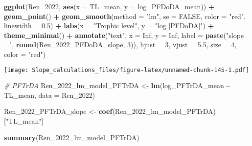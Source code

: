 \documentclass[
]{article}
\newenvironment{Shaded}{\begin{snugshade}}{\end{snugshade}}
\newcommand{\AttributeTok}[1]{\textcolor[rgb]{0.13,0.29,0.53}{#1}}
\newcommand{\CommentTok}[1]{\textcolor[rgb]{0.56,0.35,0.01}{\textit{#1}}}
\newcommand{\ConstantTok}[1]{\textcolor[rgb]{0.56,0.35,0.01}{#1}}
\newcommand{\DecValTok}[1]{\textcolor[rgb]{0.00,0.00,0.81}{#1}}
\newcommand{\FloatTok}[1]{\textcolor[rgb]{0.00,0.00,0.81}{#1}}
\newcommand{\FunctionTok}[1]{\textcolor[rgb]{0.13,0.29,0.53}{\textbf{#1}}}
\newcommand{\NormalTok}[1]{#1}
\newcommand{\OtherTok}[1]{\textcolor[rgb]{0.56,0.35,0.01}{#1}}
\newcommand{\SpecialCharTok}[1]{\textcolor[rgb]{0.81,0.36,0.00}{\textbf{#1}}}
\newcommand{\StringTok}[1]{\textcolor[rgb]{0.31,0.60,0.02}{#1}}
\begin{document}
\begin{Shaded}
\begin{Highlighting}[]
\FunctionTok{ggplot}\NormalTok{(Ren\_2022, }\FunctionTok{aes}\NormalTok{(}\AttributeTok{x =}\NormalTok{ TL\_mean, }\AttributeTok{y =}\NormalTok{ log\_PFDoDA\_mean)) }\SpecialCharTok{+}
  \FunctionTok{geom\_point}\NormalTok{() }\SpecialCharTok{+}
  \FunctionTok{geom\_smooth}\NormalTok{(}\AttributeTok{method =} \StringTok{"lm"}\NormalTok{, }\AttributeTok{se =} \ConstantTok{FALSE}\NormalTok{, }\AttributeTok{color =} \StringTok{"red"}\NormalTok{, }\AttributeTok{linewidth =} \FloatTok{0.5}\NormalTok{) }\SpecialCharTok{+}
  \FunctionTok{labs}\NormalTok{(}\AttributeTok{x =} \StringTok{"Trophic level"}\NormalTok{,}
       \AttributeTok{y =} \StringTok{"log [PFDoDA]"}\NormalTok{) }\SpecialCharTok{+}
  \FunctionTok{theme\_minimal}\NormalTok{() }\SpecialCharTok{+}
  \FunctionTok{annotate}\NormalTok{(}\StringTok{"text"}\NormalTok{, }\AttributeTok{x =} \ConstantTok{Inf}\NormalTok{, }\AttributeTok{y =} \ConstantTok{Inf}\NormalTok{, }\AttributeTok{label =} \FunctionTok{paste}\NormalTok{(}\StringTok{"slope ="}\NormalTok{, }\FunctionTok{round}\NormalTok{(Ren\_2022\_PFDoDA\_slope, }\DecValTok{3}\NormalTok{)), }
           \AttributeTok{hjust =} \DecValTok{3}\NormalTok{, }\AttributeTok{vjust =} \FloatTok{5.5}\NormalTok{, }\AttributeTok{size =} \DecValTok{4}\NormalTok{, }\AttributeTok{color =} \StringTok{"red"}\NormalTok{)}
\end{Highlighting}
\end{Shaded}

\texttt{[image: Slope\_calculations\_files/figure-latex/unnamed-chunk-145-1.pdf]}

\begin{Shaded}
\begin{Highlighting}[]
\CommentTok{\# PFTrDA}
\NormalTok{Ren\_2022\_lm\_model\_PFTrDA }\OtherTok{\textless{}{-}} \FunctionTok{lm}\NormalTok{(log\_PFTrDA\_mean }\SpecialCharTok{\textasciitilde{}}\NormalTok{ TL\_mean,}
                              \AttributeTok{data =}\NormalTok{ Ren\_2022)}

\NormalTok{Ren\_2022\_PFTrDA\_slope }\OtherTok{\textless{}{-}} \FunctionTok{coef}\NormalTok{(Ren\_2022\_lm\_model\_PFTrDA)[}\StringTok{"TL\_mean"}\NormalTok{]}

\FunctionTok{summary}\NormalTok{(Ren\_2022\_lm\_model\_PFTrDA)}
\end{Highlighting}
\end{Shaded}
\end{document}
